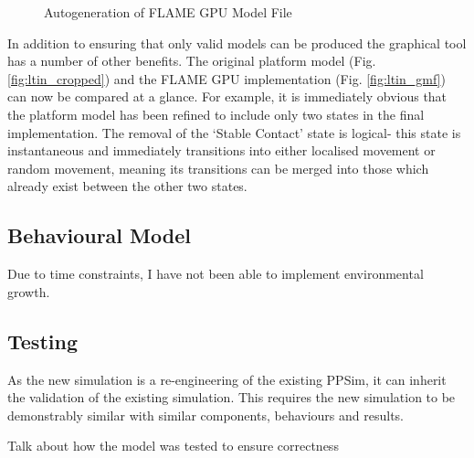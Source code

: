 \documentclass{UoYCSproject}
\begin{document}
\begin{figure}[htp]
\caption{Autogeneration of \gls{FLAME GPU} Model File}
\label{fig:gmf_flame_generation}
\end{figure}

In addition to ensuring that only valid models can be produced the graphical tool has a number of other benefits.
The original platform model (Fig. \ref{fig:ltin_cropped}) and the \gls{FLAME GPU} implementation (Fig. \ref{fig:ltin_gmf}) can now be compared at a glance.
For example, it is immediately obvious that the platform model has been refined to include only two states in the final implementation.
The removal of the `Stable Contact' state is logical- this state is instantaneous and immediately transitions into either localised movement or random movement, meaning its transitions can be merged into those which already exist between the other two states.

%

\subsection{Behavioural Model}
%

Due to time constraints, I have not been able to implement environmental growth.

\subsection{Testing}
As the new simulation is a re-engineering of the existing PPSim, it can inherit the validation of the existing simulation.
This requires the new simulation to be demonstrably similar with similar components, behaviours and results.

Talk about how the model was tested to ensure correctness\\
\end{document}
